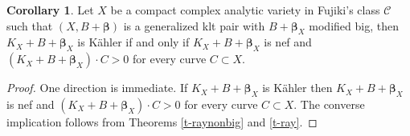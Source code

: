 \documentclass[11pt]{amsart}
\newcommand\Xieinline[1]{\todo[inline,color=green!40]{#1}} %
\numberwithin{equation}{section}
\def\bbeta{\boldsymbol{\beta}}
\newcommand\Q{{\mathbb{Q}}}
\theoremstyle{definition}
\theoremstyle{definition}
\newtheorem{corollary}[theorem]{Corollary}
\theoremstyle{definition}
\begin{document}
\begin{corollary} Let $X$ be a compact complex analytic variety in Fujiki's class $\mathcal C$ such that $(X,B+\bbeta )$ is a generalized klt pair with $B+\bbeta _X$ modified big, then $K_X+B+\bbeta _X$ is K\"ahler if and only if $K_X+B+\bbeta _X$ is nef and $(K_X+B+\bbeta _X)\cdot C>0$ for every curve $C\subset X$.
\end{corollary}
\begin{proof} One direction is immediate. If $K_X+B+\bbeta _X$ is K\"ahler then $K_X+B+\bbeta _X$ is nef and $(K_X+B+\bbeta _X)\cdot C>0$ for every curve $C\subset X$. The converse implication follows from Theorems \ref{t-raynonbig} and \ref{t-ray}.
\end{proof}
\end{document}
